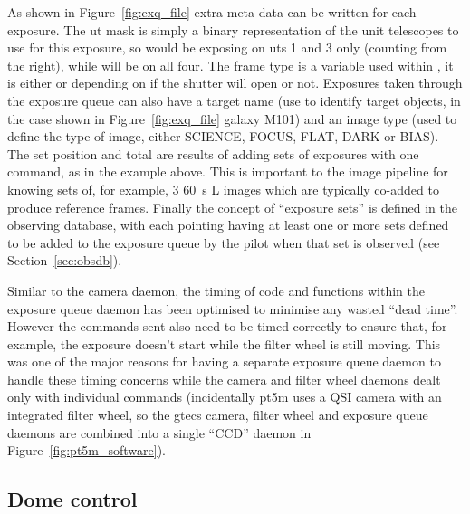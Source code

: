 \begin{colsection}
\begin{colsection}
As shown in Figure~\ref{fig:exq_file} extra meta-data can be written for each exposure. The \gls{ut} mask is simply a binary representation of the unit telescopes to use for this exposure, so  would be exposing on \glspl{ut} 1 and 3 only (counting from the right), while  will be on all four. The frame type is a variable used within , it is either  or  depending on if the shutter will open or not. Exposures taken through the exposure queue can also have a target name (use to identify target objects, in the case shown in Figure~\ref{fig:exq_file} galaxy M101) and an image type (used to define the type of image, either SCIENCE, FOCUS, FLAT, DARK or BIAS). The set position and total are results of adding sets of exposures with one command, as in the example above. This is important to the image pipeline for knowing sets of, for example, 3 \SI{60}{\second} L images which are typically co-added to produce reference frames. Finally the concept of ``exposure sets'' is defined in the observing database, with each pointing having at least one or more sets defined to be added to the exposure queue by the pilot when that set is observed (see Section~\ref{sec:obsdb}).

Similar to the camera daemon, the timing of code and functions within the exposure queue daemon has been optimised to minimise any wasted ``dead time''. However the commands sent also need to be timed correctly to ensure that, for example, the exposure doesn't start while the filter wheel is still moving. This was one of the major reasons for having a separate exposure queue daemon to handle these timing concerns while the camera and filter wheel daemons dealt only with individual commands (incidentally \gls{pt5m} uses a QSI camera with an integrated filter wheel, so the \gls{gtecs} camera, filter wheel and exposure queue daemons are combined into a single ``CCD'' daemon in Figure~\ref{fig:pt5m_software}).

\end{colsection}


\subsection{Dome control}
\label{sec:dome}
\begin{colsection}


\end{colsection}
\end{colsection}
